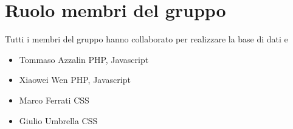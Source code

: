 \documentclass[1_relazione.tex]{subfiles}
\begin{document}
\section{Ruolo membri del gruppo}

Tutti i membri del gruppo hanno collaborato per realizzare la base di dati e 

\begin{itemize}
\item{Tommaso Azzalin} PHP, Javascript
\item{Xiaowei Wen} PHP, Javascript
\item{Marco Ferrati} CSS
\item{Giulio Umbrella} CSS
\end{itemize}
\end{document}
